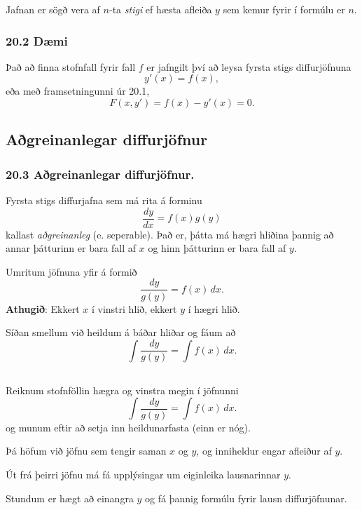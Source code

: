 Jafnan er sögð
vera af $n$-ta {\em stigi} ef hæsta afleiða $y$ sem kemur fyrir í
formúlu er $n$.
 

\pause

\subsubsection{20.2 Dæmi}
 Það að finna stofnfall fyrir fall $f$ er jafngilt því að leysa 
fyrsta stigs diffurjöfnuna 
$$
y'(x) = f(x),
$$
\pause
eða með framsetningunni úr 20.1,
$$
F(x,y') = f(x) - y'(x) = 0.
$$




\subsection[t]{Aðgreinanlegar diffurjöfnur}
 \subsubsection{20.3 Aðgreinanlegar diffurjöfnur.} 
Fyrsta stigs diffurjafna sem má rita
á forminu 
$$\frac{dy}{dx}=f(x)g(y)$$ \pause
kallast {\em aðgreinanleg} (e. seperable).  \pause
Það er, þátta má hægri hliðina  þannig að annar þátturinn
er bara fall af $x$ og hinn þátturinn er bara fall af $y$.

\pause

Umritum jöfnuna yfir á formið 
$$\frac{dy}{g(y)}=f(x)\,dx.$$ \pause
\textbf{Athugið}: Ekkert $x$ í vinstri hlið, 
ekkert $y$ í hægri hlið. 
\pause

Síðan smellum við heildum á báðar hliðar og fáum að 
$$\int\frac{dy}{g(y)}=\int f(x)\,dx.$$
 


\subsection[t]{}
 \subsubsection{} 
Reiknum stofnföllin hægra og vinstra megin í jöfnunni
$$\int\frac{dy}{g(y)}=\int f(x)\,dx.$$
og munum eftir að setja inn heildunarfasta \pause
(einn er nóg).  \pause

Þá höfum við jöfnu sem tengir saman $x$ og $y$, og inniheldur engar
afleiður af $y$. \pause

Út frá þeirri
jöfnu má fá upplýsingar um eiginleika lausnarinnar $y$. \pause 

Stundum er hægt að einangra $y$ og fá þannig formúlu fyrir lausn diffurjöfnunar.
 


